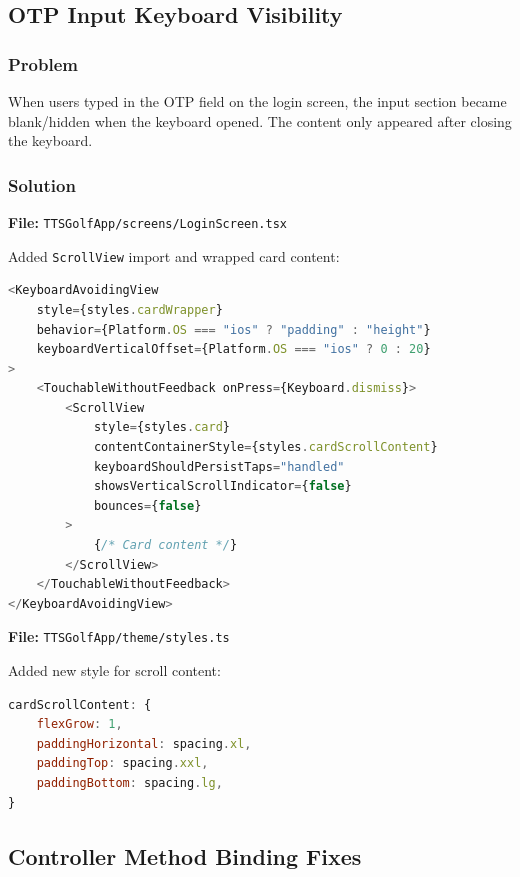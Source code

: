 \documentclass[11pt,a4paper]{article}
\begin{document}
\subsection{OTP Input Keyboard Visibility}

\subsubsection{Problem}
When users typed in the OTP field on the login screen, the input section became blank/hidden when the keyboard opened. The content only appeared after closing the keyboard.

\subsubsection{Solution}
\textbf{File:} \texttt{TTSGolfApp/screens/LoginScreen.tsx}

Added \texttt{ScrollView} import and wrapped card content:
\begin{lstlisting}[language=JavaScript]
<KeyboardAvoidingView
    style={styles.cardWrapper}
    behavior={Platform.OS === "ios" ? "padding" : "height"}
    keyboardVerticalOffset={Platform.OS === "ios" ? 0 : 20}
>
    <TouchableWithoutFeedback onPress={Keyboard.dismiss}>
        <ScrollView
            style={styles.card}
            contentContainerStyle={styles.cardScrollContent}
            keyboardShouldPersistTaps="handled"
            showsVerticalScrollIndicator={false}
            bounces={false}
        >
            {/* Card content */}
        </ScrollView>
    </TouchableWithoutFeedback>
</KeyboardAvoidingView>
\end{lstlisting}

\textbf{File:} \texttt{TTSGolfApp/theme/styles.ts}

Added new style for scroll content:
\begin{lstlisting}[language=JavaScript]
cardScrollContent: {
    flexGrow: 1,
    paddingHorizontal: spacing.xl,
    paddingTop: spacing.xxl,
    paddingBottom: spacing.lg,
}
\end{lstlisting}

\subsection{Controller Method Binding Fixes}
\end{document}
